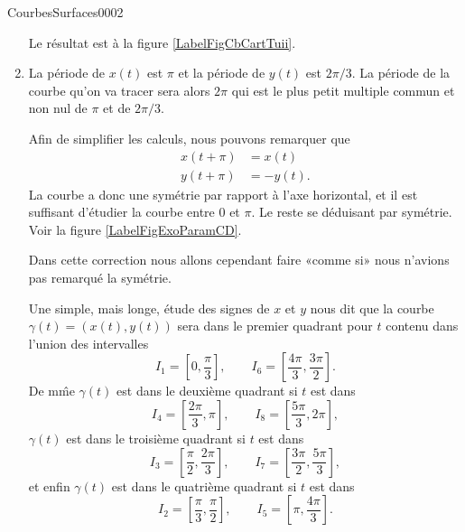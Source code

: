 \begin{corrige}{CourbesSurfaces0002}
\begin{enumerate}
Le résultat est à la figure \ref{LabelFigCbCartTuii}.                                                                   
\newcommand{\CaptionFigCbCartTuii}{La courbe de l'exercice \ref{Itemzzdexoii}.}


  \item\label{Itemzzdexoiii}
      La période de $x(t)$ est $\pi$ et la période de $y(t)$ est $2\pi/3$. La période de la courbe qu'on va tracer sera alors $2\pi$ qui est le plus petit multiple commun et non nul de $\pi$ et de $2\pi/3$.

      Afin de simplifier les calculs, nous pouvons remarquer que
      \begin{subequations}
          \begin{align}
              x(t+\pi)&=x(t)\\
              y(t+\pi)&=-y(t).
          \end{align}
      \end{subequations}
      La courbe a donc une symétrie par rapport à l'axe horizontal, et il est suffisant d'étudier la courbe entre \( 0\) et \( \pi\). Le reste se déduisant par symétrie. Voir la figure \ref{LabelFigExoParamCD}.
      \newcommand{\CaptionFigExoParamCD}{Le graphique de la courbe de l'exercice \ref{exoCourbesSurfaces0002}\ref{CourbSDvii}. La courbe en bleu représente les valeurs du paramètre entre \( 0\) et \( \pi\) tandis qu'en rouge nous avons tracé le paramètre entre \( \pi\) et \( 2\pi\).}
    

    Dans cette correction nous allons cependant faire «comme si» nous n'avions pas remarqué la symétrie.
      
      Une simple, mais longe, étude des signes de $x$ et $y$ nous dit que la courbe $\gamma(t)=(x(t), y(t))$ sera dans le premier quadrant pour $t$ contenu dans l'union des intervalles 
\[
I_1=\left[0,\frac{\pi}{3}\right],\qquad I_6=\left[\frac{4\pi}{3}, \frac{3\pi}{2}\right]. 
\]
De m\^me $\gamma(t)$ est dans le deuxième quadrant si $t$ est dans
\[
I_4=\left[\frac{2\pi}{3},\pi\right],\qquad I_8=\left[\frac{5\pi}{3}, 2\pi\right],
\]
$\gamma(t)$ est dans le troisième quadrant si $t$ est dans
\[
I_3=\left[\frac{\pi}{2},\frac{2\pi}{3}\right],\qquad I_7=\left[\frac{3\pi}{2}, \frac{5\pi}{3}\right],
\]
et enfin $\gamma(t)$ est dans le quatrième quadrant si $t$ est dans
\[
I_2=\left[\frac{\pi}{3},\frac{\pi}{2}\right],\qquad I_5=\left[\pi, \frac{4\pi}{3}\right].
\]


\end{enumerate}
\end{corrige}
